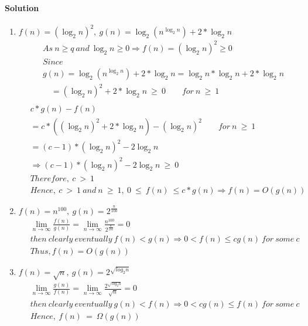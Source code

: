\documentclass[a4paper]{scrartcl}
\begin{document}
\paragraph{Solution}
\begin{enumerate}[label=(\alph*)]
  \item $f(n)=\left(\log_2n\right)^2,\ g(n)=\log_2\left(n^{\log_2{n}}\right) + 2*\log_2{n}$
  \begin{align*}
  &\ As\ n\geq q\ and\ \log_2{n}\geq 0 \Rightarrow f(n)=(\log_2{n})^2 \geq 0\\ &\
  Since\\ &\
  g(n)= \log_2\left(n^{\log_2{n}}\right) + 2*\log_2{n} = \log_2{n}*\log_2{n} + 2*\log_2{n}\\ &\
  \quad = \left(\log_2{n}\right)^2 + 2*\log_2{n}\ \geq\ 0\qquad for\ n\ \geq\ 1\\ &\
  \end{align*}
  \begin{align*}
  &\ c*g(n)-f(n)\\ &\
  =c*(\left(\log_2{n}\right)^2 + 2*\log_2{n})-(\log_2{n})^2 \qquad for\ n\ \geq\ 1 \\ &\
  =(c-1)*(\log_2{n})^2 - 2\log_2{n}\\ &\
  \Rightarrow (c-1)*(\log_2{n})^2 - 2\log_2{n}\ \geq\ 0\\ &\
  Therefore,\ c\ >\ 1\\ &\
  Hence,\ c\ >\ 1\ and\ n\ \geq\ 1,\ 0\ \leq\ f(n)\ \leq c*g(n) \Rightarrow f(n) = O(g(n))
  \end{align*}
  \item $f(n)= n^{100},\ g(n)=2^{\frac{n}{100}}$
  \begin{align*}
   &\ \lim_{n\to\infty} \frac{f(n)}{g(n)}=\lim_{n\to\infty} \frac{n^{100}}{2^{\frac{n}{100}}}=0\\ &\
  then\ clearly\ eventually\ f(n)<g(n)\Rightarrow 0<f(n)\leq cg(n)\ for\ some\ c\\ &\
  Thus, f(n)=O(g(n))
  \end{align*}
  \item $f(n)=\sqrt{n},\ g(n)=2^{\sqrt{log_2 n}}$
  \begin{align*}
    &\ \lim_{n\to\infty} \frac{g(n)}{f(n)}=\lim_{n\to\infty} \frac{2^{\sqrt{log_2 n}}}{\sqrt{n}}=0\\ &\
    then\ clearly\ eventually\ g(n)<f(n)\Rightarrow 0<cg(n)\leq f(n)\ for\ some\ c\\ &\
    Hence,\ f(n)\ =\ \Omega(g(n))
  \end{align*}

\end{enumerate}
\end{document}
